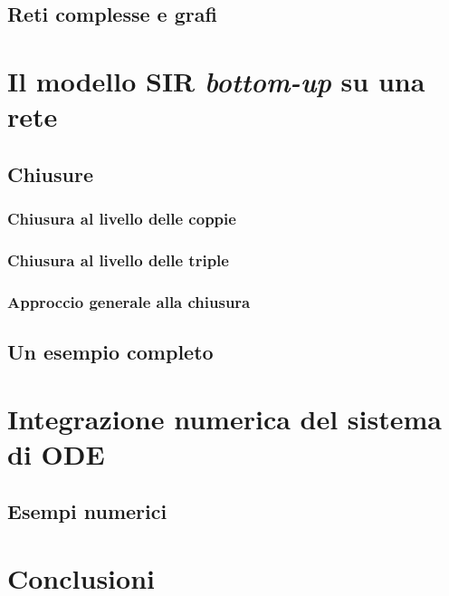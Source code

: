 \documentclass[12pt,a4paper,twoside]{report}
\begin{document}


\section{Reti complesse e grafi}

\lipsum[6-10]

\chapter{Il modello SIR \textit{bottom-up} su una rete}

\lipsum[6-10]

\section{Chiusure}

\lipsum[6-10]

\subsection{Chiusura al livello delle coppie}

\lipsum[6-10]

\subsection{Chiusura al livello delle triple}

\lipsum[6-10]

\subsection{Approccio generale alla chiusura}

\lipsum[6-10]

\section{Un esempio completo}

\lipsum[6-10]

\chapter{Integrazione numerica del sistema di ODE}

\lipsum[6-7]

\section{Esempi numerici}

\lipsum[8-10]

\chapter*{Conclusioni}

\lipsum[11-14]




\cleardoublepage
\listoffigures
{}
\listoftables
{}
\tableofcontents
\end{document}
